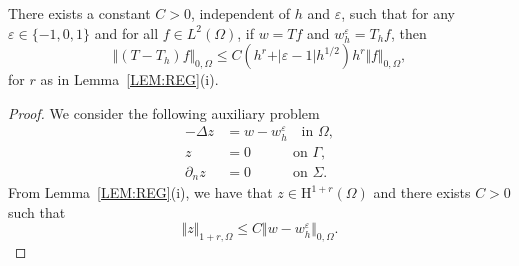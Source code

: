 \documentclass[onefignum,onetabnum,final]{siamart250211}
\numberwithin{equation}{section}
\newcommand\0{\boldsymbol{0}}
\renewcommand\O{\Omega}
\newcommand\G{\Gamma}
\renewcommand\H{\mathrm{H}}
\newcommand\HurO{\H^{1+r}(\O)}
\renewcommand\S{\Sigma}
\begin{document}
	\begin{theorem}\label{convergT}
		There exists a constant $C > 0$, independent of $h$ and $\varepsilon$, such that for any
		$\varepsilon\in\{- 1, 0, 1\}$ and for all $f\in L^2(\Omega)$,
		if $w=Tf$ and $w^{\varepsilon}_h=T_hf$, then
		$$
		\Vert(T-T_h)f\Vert_{0,\O}\le C (h^r+\vert\varepsilon-1\vert h^{1/2})h^r\Vert f\Vert_{0,\O},
		$$
		for $r$ as in Lemma~\ref{LEM:REG}(i).
	\end{theorem}
	\begin{proof}
		We consider the following auxiliary problem
		\begin{equation}\label{aux-problem}
			\begin{split}
				-\Delta z&=w-w^{\varepsilon}_h\quad\text{in }\O,\\
				z&=0\quad\qquad\text{on }\G,\\
				\partial_n z&=0\quad\qquad\text{on }\S.
			\end{split}
		\end{equation}
		From Lemma~\ref{LEM:REG}(i), we have that
		$z\in\HurO$ and there exists $C>0$
		such that
		$$\Vert z\Vert_{1+r,\O}\le C\Vert w-w^{\varepsilon}_h\Vert_{0,\O}.$$
		

\end{proof}
\end{document}
